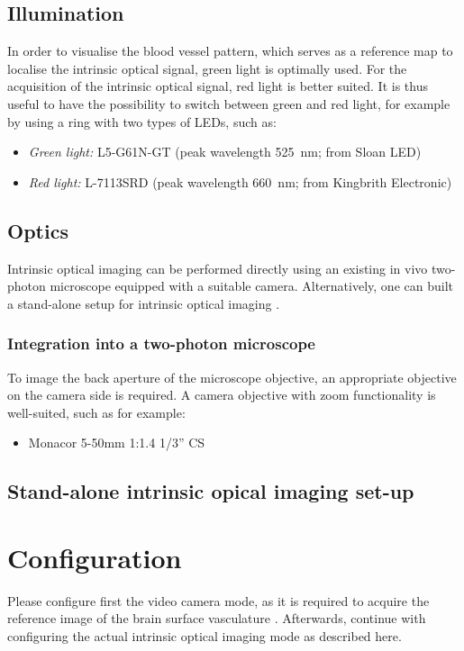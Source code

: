 \subsection{Illumination}
In order to visualise the blood vessel pattern, which serves as a reference map to localise the intrinsic optical signal, green light is optimally used. For the acquisition of the intrinsic optical signal, red light is better suited. It is thus useful to have the possibility to switch between green and red light, for example by using a ring with two types of LEDs, such as:
\begin{itemize}[noitemsep]
	\item \textit{Green light:} L5-G61N-GT (peak wavelength \SI{525}{\nm}; from Sloan LED)
    	\item \textit{Red light:} L-7113SRD (peak wavelength \SI{660}{\nm}; from Kingbrith Electronic)
\end{itemize}

\subsection{Optics}
Intrinsic optical imaging can be performed directly using an existing in vivo two-photon microscope equipped with a suitable camera. Alternatively, one can built a stand-alone setup for intrinsic optical imaging \cite{Langer2011}.

\subsubsection{Integration into a two-photon microscope}
To image the back aperture of the microscope objective, an appropriate objective on the camera side is required. A camera objective with zoom functionality is well-suited, such as for example:
\begin{itemize}
	\item Monacor 5-50mm 1:1.4 1/3'' CS 
\end{itemize}

\subsection{Stand-alone intrinsic opical imaging set-up}

\section{Configuration}\label{sec:intrinsic_configuration}
Please configure first the video camera mode, as it is required to acquire the reference image of the brain surface vasculature . Afterwards, continue with configuring the actual intrinsic optical imaging mode as described here.

